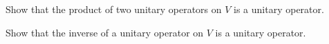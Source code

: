 \exercise
\begin{SUBtheorem}
\item
Show that the product of two unitary operators on $V$ is a unitary operator.
\item
Show that the inverse of a unitary operator on $V$ is a unitary operator.
\end{SUBtheorem}

